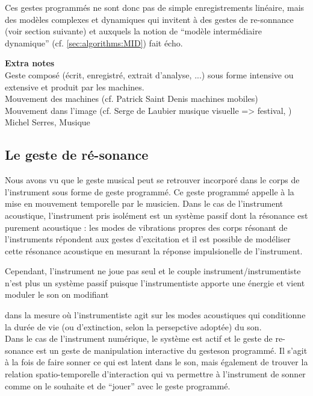  Ces gestes programmés ne sont donc pas de simple enregistrements linéaire, mais des modèles complexes et dynamiques qui invitent à des gestes de re-sonnance (voir section suivante) et auxquels la notion de ``modèle intermédiaire dynamique'' (cf. \ref{sec:algorithms:MID}) fait écho.

\textbf{Extra notes}\\

Geste composé (écrit, enregistré, extrait d'analyse, ...) sous forme intensive ou extensive et produit par les machines.\\
Mouvement des machines (cf. Patrick Saint Denis machines mobiles)\\
Mouvement dans l'image (cf. Serge de Laubier musique visuelle => festival, )\\
 Michel Serres, Musique


\subsection{Le geste de ré-sonance}

Nous avons vu que le geste musical peut se retrouver incorporé dans le corps de l'instrument sous forme de geste programmé. Ce geste programmé appelle à la mise en mouvement temporelle par le musicien.
Dans le cas de l'instrument acoustique, l'instrument pris isolément est un système passif dont la résonance est purement acoustique : les modes de vibrations propres des corps résonant de l'instruments répondent aux gestes d'excitation et il est possible de modéliser cette résonance acoustique en mesurant la réponse impulsionelle de l'instrument.

Cependant, l'instrument ne joue pas seul et le couple instrument/instrumentiste n'est plus un système passif puisque l'instrumentiste apporte une énergie et vient moduler le son on modifiant 

dans la mesure où l'instrumentiste agit sur les modes acoustiques qui conditionne la durée de vie (ou d'extinction, selon la persepctive adoptée) du son. \\
Dans le cas de l'instrument numérique, le système est actif et le geste de re-sonance est un geste de manipulation interactive du geste\/son programmé.
Il s'agit à la fois de faire sonner ce qui est latent dans le son, mais également de trouver la relation spatio-temporelle d'interaction qui va permettre à l'instrument de sonner comme on le souhaite et de ``jouer'' avec le geste programmé.

